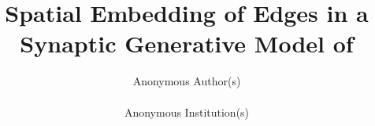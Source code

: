 \title{Spatial Embedding of Edges in a Synaptic Generative Model of \\
 \ce}

 \author{Anonymous Author(s)\\
\mbox{}\\
Anonymous Institution(s)}

